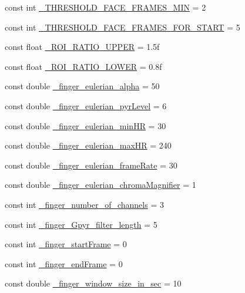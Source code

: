 \begin{DoxyCompactItemize}
\item 
const int \hyperlink{namespace_m_h_r_a90f94ddb83c7c54b9b0836586a51ad43}{\+\_\+\+T\+H\+R\+E\+S\+H\+O\+L\+D\+\_\+\+F\+A\+C\+E\+\_\+\+F\+R\+A\+M\+E\+S\+\_\+\+M\+I\+N} = 2
\item 
const int \hyperlink{namespace_m_h_r_a3c94a936257b6f3257fb7a7768ff4377}{\+\_\+\+T\+H\+R\+E\+S\+H\+O\+L\+D\+\_\+\+F\+A\+C\+E\+\_\+\+F\+R\+A\+M\+E\+S\+\_\+\+F\+O\+R\+\_\+\+S\+T\+A\+R\+T} = 5
\item 
const float \hyperlink{namespace_m_h_r_a4059754ac07ffb5b08e096059f347a82}{\+\_\+\+R\+O\+I\+\_\+\+R\+A\+T\+I\+O\+\_\+\+U\+P\+P\+E\+R} = 1.\+5f
\item 
const float \hyperlink{namespace_m_h_r_a8a54577ca92c7aa81cc87355a7160063}{\+\_\+\+R\+O\+I\+\_\+\+R\+A\+T\+I\+O\+\_\+\+L\+O\+W\+E\+R} = 0.\+8f
\item 
const double \hyperlink{namespace_m_h_r_abe389732cdfc0aa8ebf51a84c4e645a4}{\+\_\+finger\+\_\+eulerian\+\_\+alpha} = 50
\item 
const double \hyperlink{namespace_m_h_r_a197af9978c9b4d443571197f5ad1b019}{\+\_\+finger\+\_\+eulerian\+\_\+pyr\+Level} = 6
\item 
const double \hyperlink{namespace_m_h_r_a2d844de82559885b3d8a333c82b1a733}{\+\_\+finger\+\_\+eulerian\+\_\+min\+H\+R} = 30
\item 
const double \hyperlink{namespace_m_h_r_ab2ef19fc7e685e8a85fbbbc75320fd6e}{\+\_\+finger\+\_\+eulerian\+\_\+max\+H\+R} = 240
\item 
const double \hyperlink{namespace_m_h_r_a6a102813ef2ea5aa11cadcc9ebaa5bbc}{\+\_\+finger\+\_\+eulerian\+\_\+frame\+Rate} = 30
\item 
const double \hyperlink{namespace_m_h_r_adc0b183529468e1b7d2eec8275c004a6}{\+\_\+finger\+\_\+eulerian\+\_\+chroma\+Magnifier} = 1
\item 
const int \hyperlink{namespace_m_h_r_aa01f8308d2cb5cdb00c4a45de8a8cd5e}{\+\_\+finger\+\_\+number\+\_\+of\+\_\+channels} = 3
\item 
const int \hyperlink{namespace_m_h_r_a5b1bf691aa0c1246b140b3f67580c229}{\+\_\+finger\+\_\+\+Gpyr\+\_\+filter\+\_\+length} = 5
\item 
const int \hyperlink{namespace_m_h_r_a9b0e8542961b24a5dc2e1f77df715b51}{\+\_\+finger\+\_\+start\+Frame} = 0
\item 
const int \hyperlink{namespace_m_h_r_aab21e4fd871ccbbdfc656aa4d64aa688}{\+\_\+finger\+\_\+end\+Frame} = 0
\item 
const double \hyperlink{namespace_m_h_r_a04093f94b342ed569322ef2c3a5bcce2}{\+\_\+finger\+\_\+window\+\_\+size\+\_\+in\+\_\+sec} = 10

\end{DoxyCompactItemize}

